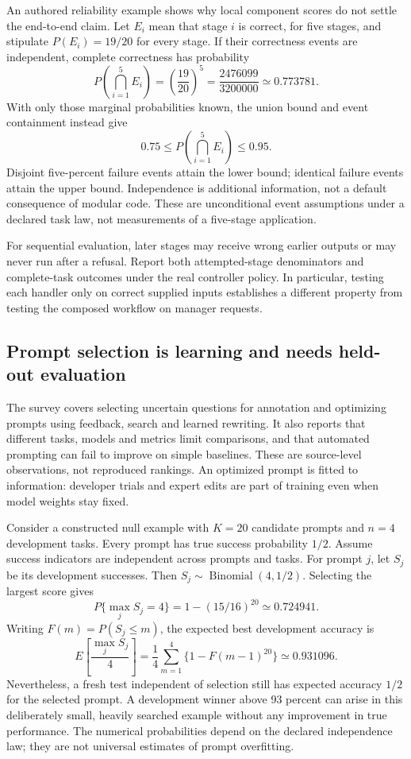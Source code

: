 An authored reliability example shows why local component scores do not settle
the end-to-end claim. Let $E_i$ mean that stage $i$ is correct, for five stages,
and stipulate $P(E_i)=19/20$ for every stage. If their correctness events are
independent, complete correctness has probability
\[
 P\!\left(\bigcap_{i=1}^{5}E_i\right)
     =\left(\frac{19}{20}\right)^5
     =\frac{2476099}{3200000}\simeq0.773781.
\]
With only those marginal probabilities known, the union bound and event
containment instead give
\[
 0.75\leq P\!\left(\bigcap_{i=1}^{5}E_i\right)\leq0.95.
\]
Disjoint five-percent failure events attain the lower bound; identical failure
events attain the upper bound. Independence is additional information, not a
default consequence of modular code. These are unconditional event assumptions
under a declared task law, not measurements of a five-stage application.
\citep{exec24_promptengineering_reference}

For sequential evaluation, later stages may receive wrong earlier outputs or
may never run after a refusal. Report both attempted-stage denominators and
complete-task outcomes under the real controller policy. In particular,
testing each handler only on correct supplied inputs establishes a different
property from testing the composed workflow on manager requests.

\subsection{Prompt selection is learning and needs held-out evaluation}

The survey covers selecting uncertain questions for annotation and optimizing
prompts using feedback, search and learned rewriting. It also reports that
different tasks, models and metrics limit comparisons, and that automated
prompting can fail to improve on simple baselines. These are source-level
observations, not reproduced rankings. An optimized prompt is fitted to
information: developer trials and expert edits are part of training even when
model weights stay fixed.\citep{exec24_promptengineering_original}

Consider a constructed null example with $K=20$ candidate prompts and $n=4$
development tasks. Every prompt has true success probability $1/2$. Assume
success indicators are independent across prompts and tasks. For prompt $j$,
let $S_j$ be its development successes. Then $S_j\sim\operatorname{Binomial}(4,1/2)$.
Selecting the largest score gives
\[
 P\{\max_j S_j=4\}=1-(15/16)^{20}\simeq0.724941.
\]
Writing $F(m)=P(S_j\leq m)$, the expected best development accuracy is
\[
 E\!\left[\frac{\max_j S_j}{4}\right]
 =\frac14\sum_{m=1}^{4}\{1-F(m-1)^{20}\}
 \simeq0.931096.
\]
Nevertheless, a fresh test independent of selection still has expected
accuracy $1/2$ for the selected prompt. A development winner above 93 percent
can arise in this deliberately small, heavily searched example without any
improvement in true performance. The numerical probabilities depend on the
declared independence law; they are not universal estimates of prompt overfitting.
\citep{exec24_promptengineering_reference}

